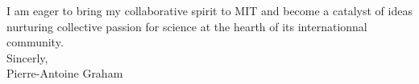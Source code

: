 \documentclass[12pt]{article}
\begin{document}
I am eager to bring my collaborative spirit to MIT and become a catalyst of ideas nurturing collective passion for science at the hearth of its internationnal community. \\[0.3cm]

Sincerly, \\

Pierre-Antoine Graham
\end{document}
